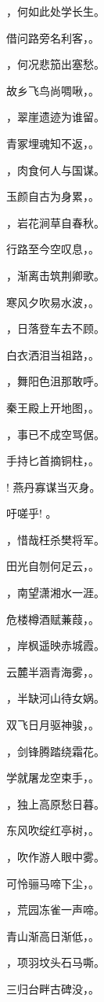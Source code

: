 \documentclass[12pt, a4paper, addpoints, answers]{exam}
\begin{document}
\begin{questions}
\question[3] \fillin ，何如此处学长生。

\question[3] 借问路旁名利客，\fillin 。

\question[3] \fillin ，何况悲笳出塞愁。

\question[3] 故乡飞鸟尚啁啾，\fillin 。

\question[3] \fillin ，翠崖遗迹为谁留。

\question[3] 青冢埋魂知不返，\fillin 。

\question[3] \fillin ，肉食何人与国谋。

\question[3] 玉颜自古为身累，\fillin 。

\question[3] \fillin ，岩花涧草自春秋。

\question[3] 行路至今空叹息，\fillin 。

\question[3] \fillin ，渐离击筑荆卿歌。

\question[3] 寒风夕吹易水波，\fillin 。

\question[3] \fillin ，日落登车去不顾。

\question[3] 白衣洒泪当祖路，\fillin 。

\question[3] \fillin ，舞阳色沮那敢呼。

\question[3] 秦王殿上开地图，\fillin 。

\question[3] \fillin ，事已不成空骂倨。

\question[3] 手持匕首摘铜柱，\fillin 。

\question[3] \fillin ! 燕丹寡谋当灭身。

\question[3] 吁嗟乎! \fillin 。

\question[3] \fillin ，惜哉枉杀樊将军。

\question[3] 田光自刎何足云，\fillin 。

\question[3] \fillin ，南望潇湘水一涯。

\question[3] 危楼樽酒赋蒹葭，\fillin 。

\question[3] \fillin ，岸枫遥映赤城霞。

\question[3] 云麓半涵青海雾，\fillin 。

\question[3] \fillin ，半缺河山待女娲。

\question[3] 双飞日月驱神骏，\fillin 。

\question[3] \fillin ，剑锋腾踏绕霜花。

\question[3] 学就屠龙空束手，\fillin 。

\question[3] \fillin ，独上高原愁日暮。

\question[3] 东风吹绽红亭树，\fillin 。

\question[3] \fillin ，吹作游人眼中雾。

\question[3] 可怜骊马啼下尘，\fillin 。

\question[3] \fillin ，荒园冻雀一声啼。

\question[3] 青山渐高日渐低，\fillin 。

\question[3] \fillin ，项羽坟头石马嘶。

\question[3] 三归台畔古碑没，\fillin 。

\end{questions}
\end{document}
